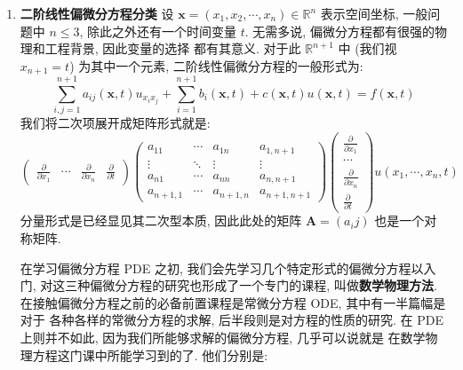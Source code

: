 \documentclass[UTF8]{book}
\begin{document}
\begin{enumerate}
    \item \textbf{二阶线性偏微分方程分类} 
    设 $\boldsymbol{x} = (x_1,x_2,\cdots,x_n) \in \mathbb{R}^n$ 
    表示空间坐标, 一般问题中 $n\leq 3$, 除此之外还有一个时间变量 
    $t$. 无需多说, 偏微分方程都有很强的物理和工程背景, 因此变量的选择
    都有其意义. 对于此 $\mathbb{R}^{n+1}$ 中 (我们视 $x_{n+1}=t$) 
    为其中一个元素, 二阶线性偏微分方程的一般形式为: 
    $$ \sum_{i,j=1}^{n+1} a_{ij}(\boldsymbol{x},t)u_{x_ix_j} + 
    \sum_{i=1}^{n+1}b_i(\boldsymbol{x},t)+ c(\boldsymbol{x},t)
    u(\boldsymbol{x},t) = f(\boldsymbol{x},t) $$
    我们将二次项展开成矩阵形式就是: 
    \begin{equation*}
        \begin{pmatrix}
            \frac{\partial}{\partial x_1} &
            \cdots &
            \frac{\partial}{\partial x_n} &
            \frac{\partial}{\partial t}  
        \end{pmatrix}
        \begin{pmatrix}
            a_{11} & \cdots & a_{1n} & a_{1,n+1} \\
            \vdots & \ddots & \vdots &\vdots \\
            a_{n1} & \cdots & a_{nn} & a_{n,n+1} \\
            a_{n+1,1} & \cdots & a_{n+1,n} & a_{n+1,n+1} 
        \end{pmatrix}
        \begin{pmatrix}
            \frac{\partial}{\partial x_1} \\
            \cdots \\
            \frac{\partial}{\partial x_n} \\
            \frac{\partial}{\partial t}  
        \end{pmatrix}
        u(x_1,\cdots,x_n,t)
    \end{equation*}
    分量形式是已经显见其二次型本质, 因此此处的矩阵 $\boldsymbol{A} = (a_ij)$ 
    也是一个对称矩阵. 
    
    在学习偏微分方程 PDE 之初, 我们会先学习几个特定形式的偏微分方程以入门, 
    对这三种偏微分方程的研究也形成了一个专门的课程, 叫做\textbf{数学物理方法}. 
    在接触偏微分方程之前的必备前置课程是常微分方程 ODE, 其中有一半篇幅是对于
    各种各样的常微分方程的求解, 后半段则是对方程的性质的研究. 
    在 PDE 上则并不如此, 因为我们所能够求解的偏微分方程, 几乎可以说就是
    在数学物理方程这门课中所能学习到的了. 他们分别是: 


\end{enumerate}
\end{document}
